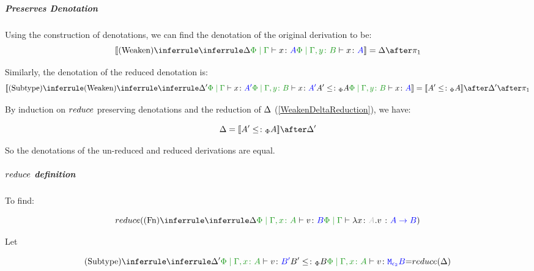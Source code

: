 \documentclass{report}
\begin{document}
            \subparagraph{Preserves Denotation}
            Using the construction of denotations, we can find the denotation of the original derivation to be:
            \begin{equation}
                \deno{\ntreeruleI{Weaken}{\treeruleI{\D}{\gpetyperelation{x}{A}}}{\etyperelation{\P}{\gby}{x}{A}}} = \D \after \p
            \end{equation}

            Similarly, the denotation of the reduced denotation is:
            \begin{equation}
                \deno{\ntreeruleII{Subtype}{
                    \ntreeruleI{Weaken}{
                        \treeruleI{\D'}{\gpetyperelation{x}{A'}}
                    } {
                        \etyperelation{\P}{\gby}{x}{A'}
                    }
                    }{
                    A' \subtypep A
                    }{\etyperelation{\P}{\gby}{x}{A}}} = \deno{A'\subtypep A}\after \D' \after \p
            \end{equation}


            By induction on $reduce$ preserving denotations and the reduction of $\Delta$ (\ref{WeakenDeltaReduction}), we have:

            \begin{equation}
                \D = \deno{A' \subtypep A}\after\D'
            \end{equation}

            So the denotations of the un-reduced and reduced derivations are equal.

            \subparagraph{$reduce$ definition}
                To find:
            
                \begin{equation}
                    \reduce(\ntreeruleI{Fn}{
                        \treeruleI{\D}{\etyperelation{\P}{\gax}{v}{B}}
                    }{\gpetyperelation{\lam{x}{A}{v}}{\ab}})
                \end{equation}

                Let 

                \begin{equation}
                    \ntreeruleII{Subtype}{
                        \treeruleI{\D'}{\etyperelation{\P}{\gax}{v}{B'}}
                        B' \subtypep B
                    }{
                        \etyperelation{\P}{\gax}{v}{\M{\e_2}{B}}
                    } = \reduce(\D)
                \end{equation}
\end{document}
